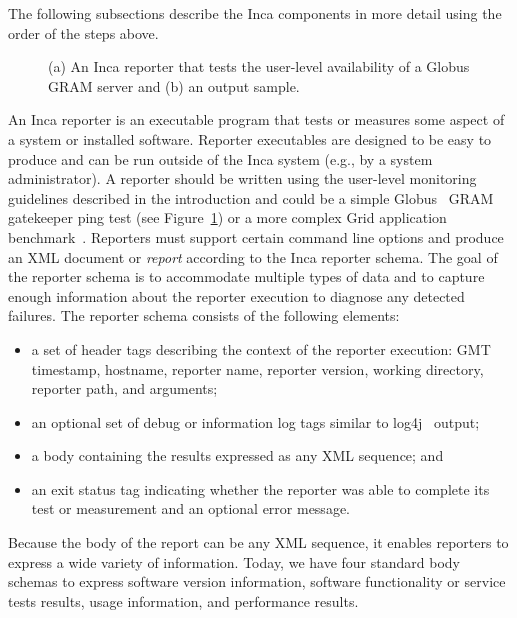 \documentclass[times,10pt,twocolumn]{article}
\begin{document}
\noindent The following subsections describe the Inca components in more
detail using the order of the steps above.


\lstset{
  basicstyle=\scriptsize\ttfamily, 
  frame=single,
  keywordstyle=\textbf, 
  identifierstyle=, 
  commentstyle=\scriptsize\ttfamily, 
  stringstyle=\ttfamily, 
  numbers=left, 
  numberstyle=\scriptsize,
  stepnumber=2,
  firstnumber=1,
  showstringspaces=false} 
\begin{figure}
\lstset{language=Perl} 
\subfigure[]{}
\subfigure[]{}
\caption{\label{pingReporter}(a) An Inca reporter that tests the user-level
availability of a Globus GRAM server and (b) an output sample.}
\end{figure}

An Inca reporter is an executable program that tests or measures some aspect
of a system or installed software.   Reporter executables are designed to be
easy to produce and can be run outside of the Inca system (e.g., by a system
administrator).  A reporter should be written using the user-level
monitoring guidelines described in the introduction and could be a simple
Globus~\cite{globus} GRAM gatekeeper ping test (see Figure~\ref{pingReporter})
or a more complex Grid application benchmark~\cite{grasp}.  Reporters must
support certain command line options and produce an XML document or
\emph{report}
according to the Inca reporter schema.  The goal of the reporter schema is to
accommodate multiple types of data and to capture enough information about the
reporter execution to diagnose any detected failures.  The reporter schema
consists of the following elements: 

\begin{itemize}
\item a set of header tags describing the context of the reporter
execution:  GMT timestamp, hostname, reporter name, reporter version, working
directory, reporter path, and arguments;
\item an optional set of debug or information log tags similar to log4j~\cite{log4j} output;
\item a body containing the results expressed as any XML sequence; and
\item an exit status tag
indicating whether the reporter was able to complete its test or measurement
and an optional error message.  
\end{itemize} 
\noindent Because the body of the report can be any XML sequence, it enables
reporters to express a wide variety of information.  Today, we have four
standard body schemas to express software version information, software
functionality or service tests results, usage information, and performance
results.  
\end{document}
